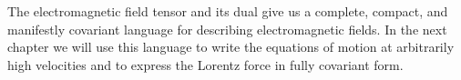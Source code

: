 The electromagnetic field tensor and its dual give us a complete, compact, and manifestly covariant language for describing electromagnetic fields. In the next chapter we will use this language to write the equations of motion at arbitrarily high velocities and to express the Lorentz force in fully covariant form.
